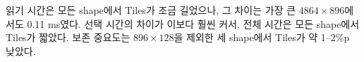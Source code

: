 읽기 시간은 모든 shape에서 Tiles가 조금 길었으나, 그 차이는 가장 큰 $4864\times896$에서도 0.11 ms였다. 선택 시간의 차이가 이보다 훨씬 커서, 전체 시간은 모든 shape에서 Tiles가 짧았다. 보존 중요도는 $896\times128$을 제외한 세 shape에서 Tiles가 약 1--2\%p 낮았다.

